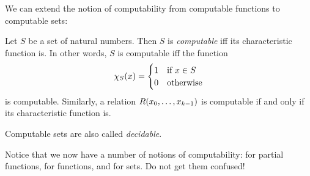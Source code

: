 \documentclass[../../include/open-logic-section]{subfiles}
\begin{document}

We can extend the notion of computability from computable functions to
computable sets:

\begin{defn}
  Let $S$ be a set of natural numbers. Then $S$ is \emph{computable}
  iff its characteristic function is. In other words, $S$ is
  computable iff the function
\[
\Char{S}(x) = 
\begin{cases}
1 & \text{if $x \in S$} \\
0 & \text{otherwise}
\end{cases}
\]
is computable. Similarly, a relation $\mathord{R}(x_0, \dots, x_{k-1})$ is
computable if and only if its characteristic function is.
\end{defn}

\begin{explain}
Computable sets are also called \emph{decidable}.

Notice that we now have a number of notions of computability: for
partial functions, for functions, and for sets. Do not get them
confused!{} 
\end{explain}
\end{document}
